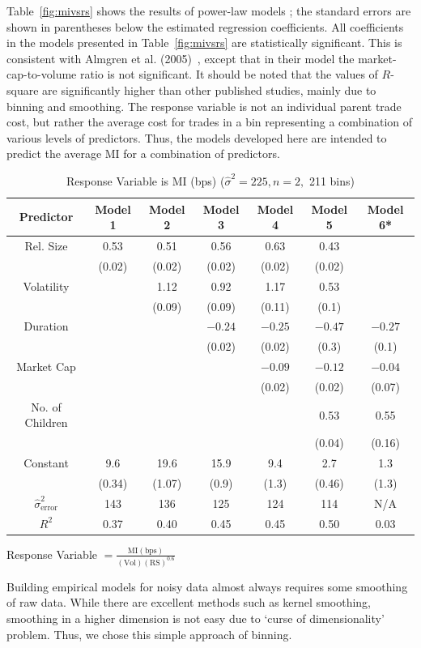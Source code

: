 Table~\ref{fig:mivsrs} shows the results of power-law models ; the standard errors are shown in parentheses below the estimated regression coefficients. All coefficients in the models presented in Table~\ref{fig:mivsrs} are statistically significant. This is consistent with Almgren et al. (2005)~\cite{athl}, except that in their model the market-cap-to-volume ratio is not significant. It should be noted that the values of $R$-square are significantly higher than other published studies, mainly due to binning and smoothing. The response variable is not an individual parent trade cost, but rather the average cost for trades in a bin representing a combination of various levels of predictors. Thus, the models developed here are intended to predict the average MI for a combination of predictors.
        \begin{table}[!ht]
        \caption{Response Variable is MI (bps) ($\hat{\sigma}^2=225, n=2,$ 211 bins) \label{tab:responsevarmi}}
        \begin{tabular}{|c|c|c|c|c|c|c|}
        Predictor & Model 1& Model 2 & Model 3 & Model 4 & Model 5 & Model 6* \\ \hline
        Rel. Size & 0.53 & 0.51 & 0.56 & 0.63 & 0.43 & \\
        	& (0.02) & (0.02) & (0.02) & (0.02) & (0.02) & \\
        Volatility & & 1.12 & 0.92 & 1.17 & 0.53 & \\
        	& & (0.09) & (0.09) & (0.11) & (0.1) & \\
        Duration	& & & $-0.24$ & $-0.25$ & $-0.47$ & $-0.27$ \\
        	& & & (0.02) & (0.02) & (0.3) & (0.1) \\
        Market Cap & & & & $-0.09$ & $-0.12$ & $-0.04$ \\
        	& & & & (0.02) & (0.02) & (0.07) \\
        No. of Children & & & & & 0.53 & 0.55 \\
        	& & & & & (0.04) & (0.16) \\
        Constant & 9.6 & 19.6 & 15.9 & 9.4 & 2.7 & 1.3 \\
        	& (0.34) & (1.07) & (0.9) & (1.3) & (0.46) & (1.3) \\ \hline
        $\hat{\sigma}_{\text{error}}^2$ & 143 & 136 & 125 & 124 & 114 & N/A \\
        $R^2$ & 0.37 & 0.40 & 0.45 & 0.45 & 0.50 & 0.03 \\
        \end{tabular}
        {\small*Response Variable $= \frac{\text{MI}(\text{bps})}{(\text{Vol})(\text{RS})^{0.6}}$}
        \end{table}
Building empirical models for noisy data almost always requires some smoothing of raw data. While there are excellent methods such as kernel smoothing, smoothing in a higher dimension is not easy due to `curse of dimensionality' problem. Thus, we chose this simple approach of binning. 



